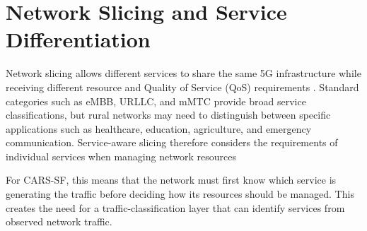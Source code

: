 \documentclass[12pt,a4paper]{report}
\begin{document}
\section{Network Slicing and Service Differentiation}
\label{sec:network_slicing}

Network slicing allows different services to share the same 5G
infrastructure while receiving different resource and Quality of Service
(QoS) requirements \cite{kazmi2019slicing}. Standard
categories such as eMBB, URLLC, and mMTC provide broad service
classifications, but rural networks may need to distinguish between
specific applications such as healthcare, education, agriculture, and
emergency communication. Service-aware slicing therefore considers the
requirements of individual services when managing network resources

For CARS-SF, this means that the network must first know which service
is generating the traffic before deciding how its resources should be
managed. This creates the need for a traffic-classification layer that
can identify services from observed network traffic.
\end{document}
